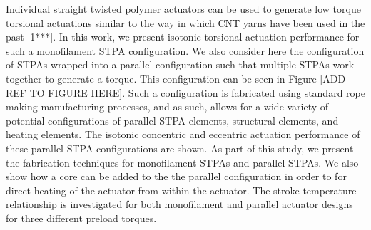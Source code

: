 \documentclass[twocolumn,10pt]{asme2e}
\begin{document}
Individual straight twisted polymer actuators can be used to generate low torque torsional actuations similar to the way in which CNT yarns have been used in the past [1***]. In this work, we present isotonic torsional actuation performance for such a monofilament STPA configuration. We also consider here the configuration of STPAs wrapped into a parallel configuration such that multiple STPAs work together to generate a torque. This configuration can be seen in Figure [ADD REF TO FIGURE HERE]. Such a configuration is fabricated using standard rope making manufacturing processes, and as such, allows for a wide variety of potential configurations of parallel STPA elements, structural elements, and heating elements. The isotonic concentric and eccentric actuation performance of these parallel STPA configurations are shown. As part of this study, we present the fabrication techniques for monofilament STPAs and parallel STPAs. We also show how a core can be added to the the parallel configuration in order to for direct heating of the actuator from within the actuator. The stroke-temperature relationship is investigated for both monofilament and parallel actuator designs for three different preload torques. 

%
%
%
%
%
% 
 
\end{document}
